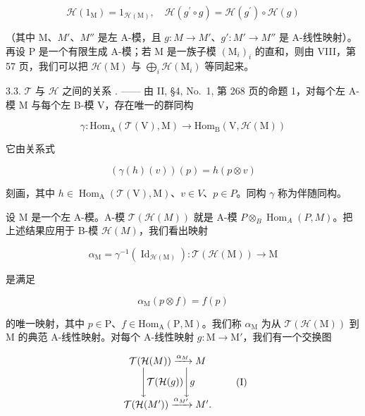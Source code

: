 \[
\mathcal {H} (1 _ {\mathrm{M}}) = 1 _ {\mathcal {H} (\mathrm{M})}, \quad \mathcal {H} (g ^ {\prime} \circ g) = \mathcal {H} (g ^ {\prime}) \circ \mathcal {H} (g)\tag{4}
\]

（其中 M、\(M'\)、\(M''\) 是左 A-模，且 \(g : M \to M'\)、\(g' : M' \to M''\) 是 A-线性映射）。再设 P 是一个有限生成 A-模；若 M 是一族子模 \((\mathrm{M}_{i})_{i}\) 的直和，则由 VIII，第 57 页，我们可以把 \(\mathcal{H}(\mathrm{M})\) 与 \(\bigoplus_{i} \mathcal{H}(\mathrm{M}_{i})\) 等同起来。

3.3. \(\mathcal{T}\) 与 \(\mathcal{H}\) 之间的关系 . —— 由 II, §4, No.~1, 第 268 页的命题 1，对每个左 A-模 M 与每个左 B-模 V，存在唯一的群同构

\[
\gamma : \mathrm{Hom} _ {\mathrm{A}} (\mathcal {T} (\mathrm{V}), \mathrm{M}) \longrightarrow \mathrm{Hom} _ {\mathrm{B}} (\mathrm{V}, \mathcal {H} (\mathrm{M}))\tag{5}
\]

它由关系式

\[
(\gamma (h) (v)) (p) = h (p \otimes v)\tag{6}
\]

刻画，其中 \(h \in \operatorname{Hom}_{\mathrm{A}}(\mathcal{T}(\mathrm{V}), \mathrm{M})\)、\(v \in V\)、\(p \in P\)。同构 \(\gamma\) 称为伴随同构。

设 M 是一个左 A-模。A-模 \(\mathcal{T}(\mathcal{H}(M))\) 就是 A-模 \(P \otimes_{B} \operatorname{Hom}_{A}(P, M)\)。把上述结果应用于 B-模 \(\mathcal{H}(M)\)，我们看出映射

\[
\alpha_ {\mathrm{M}} = \gamma^ {- 1} (\operatorname{Id} _ {\mathcal {H} (\mathrm{M})}): \mathcal {T} (\mathcal {H} (\mathrm{M})) \longrightarrow \mathrm{M}
\]

是满足

\[
\alpha_ {\mathrm{M}} (p \otimes f) = f (p)\tag{7}
\]

的唯一映射，其中 \(p \in \mathrm{P}\)、\(f \in \mathrm{Hom}_{\mathrm{A}}(\mathrm{P}, \mathrm{M})\)。我们称 \(\alpha_{\mathrm{M}}\) 为从 \(\mathcal{T}(\mathcal{H}(\mathrm{M}))\) 到 M 的典范 A-线性映射。对每个 A-线性映射 \(g: \mathrm{M} \to \mathrm{M}'\)，我们有一个交换图

\[
\begin{array}{c} \mathcal {T} (\mathcal {H} (M)) \xrightarrow {\alpha_ {M}} M \\ \Biggl \downarrow \mathcal {T} (\mathcal {H} (g)) \Biggl \downarrow g \\ \mathcal {T} (\mathcal {H} (M ^ {\prime})) \xrightarrow {\alpha_ {M ^ {\prime}}} M ^ {\prime}. \end{array}\tag{I}
\]


